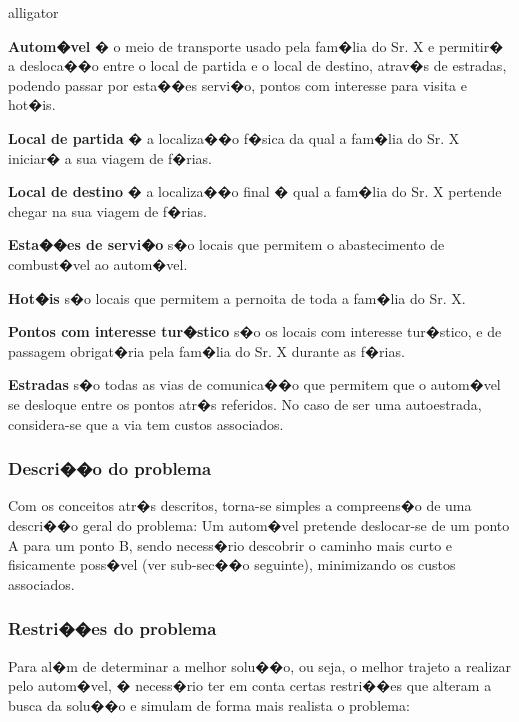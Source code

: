 \documentclass[a4paper,11pt]{article}
\begin{document}
\begin{labeling}{alligator}
\item [\textbf{Autom�vel}] � o meio de transporte usado pela fam�lia do Sr. X e permitir� a desloca��o entre o local de partida e o local de destino, atrav�s de estradas, podendo passar por esta��es servi�o, pontos com interesse para visita e hot�is.
\item [\textbf{Local de partida}] � a localiza��o f�sica da qual a fam�lia do Sr. X iniciar� a sua viagem de f�rias.
\item [\textbf{Local de destino}] � a localiza��o final � qual a fam�lia do Sr. X pertende chegar na sua viagem de f�rias.
\item [\textbf{Esta��es de servi�o}] s�o locais que permitem o abastecimento de combust�vel ao autom�vel.
\item [\textbf{Hot�is}] s�o locais que permitem a pernoita de toda a fam�lia do Sr. X.
\item [\textbf{Pontos com interesse tur�stico}] s�o os locais com interesse tur�stico, e de passagem obrigat�ria pela fam�lia do Sr. X durante as f�rias.
\item [\textbf{Estradas}] s�o todas as vias de comunica��o que permitem que o autom�vel se desloque entre os pontos atr�s referidos. No caso de ser uma autoestrada, considera-se que a via tem custos associados.
\end{labeling}

\subsubsection{Descri��o do problema}
Com os conceitos atr�s descritos, torna-se simples a compreens�o de uma descri��o geral do problema: Um autom�vel pretende deslocar-se de um ponto A para um ponto B, sendo necess�rio descobrir o caminho mais curto e fisicamente poss�vel (ver sub-sec��o seguinte), minimizando os custos associados.

\subsubsection{Restri��es do problema}
Para al�m de determinar a melhor solu��o, ou seja, o melhor trajeto a realizar pelo autom�vel, � necess�rio ter em conta certas restri��es que alteram a busca da solu��o e simulam de forma mais realista o problema:
\end{document}
